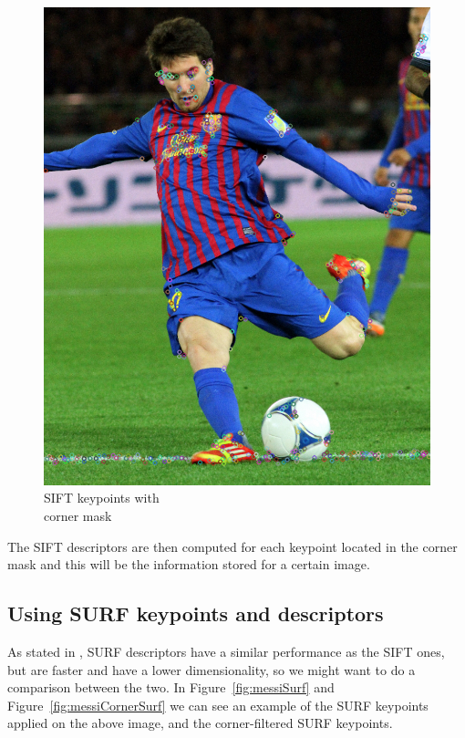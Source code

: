 \begin{figure}[ht!]
\begin{minipage}{.5\textwidth}
	\includegraphics[width=.8\linewidth]{images/messiCornerSift.png}
	\caption{SIFT keypoints with\\ corner mask}
	\label{fig:messiCornerSift}
\end{minipage}
\end{figure}

The SIFT descriptors are then computed for each keypoint located in the corner mask and this will be the information stored for a certain image.

\subsection{Using SURF keypoints and descriptors}

As stated in , SURF descriptors have a similar performance as the SIFT ones, but are faster and have a lower dimensionality, so we might want to do a comparison between the two.
In Figure~\ref{fig:messiSurf} and Figure~\ref{fig:messiCornerSurf} we can see an example of the SURF keypoints applied on the above image, and the corner-filtered SURF keypoints.

